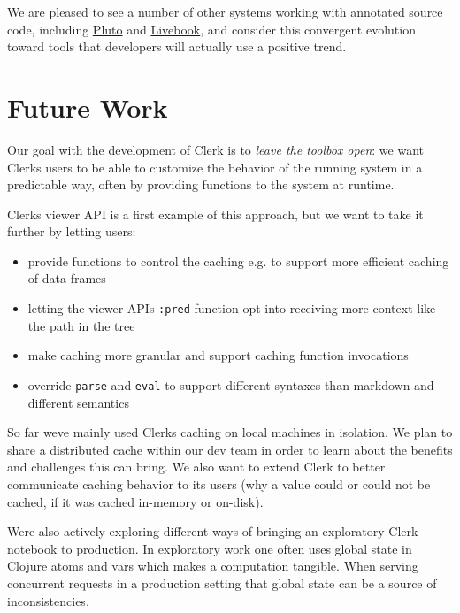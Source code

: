 \documentclass[sigconf,screen]{acmart}
\newcommand{\passthrough}[1]{#1}
\providecommand{\tightlist}{%
  \setlength{\itemsep}{0pt}\setlength{\parskip}{0pt}}
\begin{document}
We are pleased to see a number of other systems working with annotated source code, including \href{https://plutojl.org}{Pluto} and \href{https://livebook.dev}{Livebook}, and consider this convergent evolution toward tools that developers will actually use a positive trend.

\hypertarget{future-work}{%
\section{Future Work}\label{future-work}}

Our goal with the development of Clerk is to \emph{leave the toolbox open}: we want Clerk\textquotesingle s users to be able to customize the behavior of the running system in a predictable way, often by providing functions to the system at runtime.

Clerk\textquotesingle s viewer API is a first example of this approach, but we want to take it further by letting users:

\begin{itemize}
\tightlist
\item
  provide functions to control the caching e.g. to support more efficient caching of data frames
\item
  letting the viewer API\textquotesingle s \passthrough{\lstinline!:pred!} function opt into receiving more context like the path in the tree
\item
  make caching more granular and support caching function invocations
\item
  override \passthrough{\lstinline!parse!} and \passthrough{\lstinline!eval!} to support different syntaxes than markdown and different semantics
\end{itemize}

So far we\textquotesingle ve mainly used Clerk\textquotesingle s caching on local machines in isolation. We plan to share a distributed cache within our dev team in order to learn about the benefits and challenges this can bring. We also want to extend Clerk to better communicate caching behavior to its users (why a value could or could not be cached, if it was cached in-memory or on-disk).

We\textquotesingle re also actively exploring different ways of bringing an exploratory Clerk notebook to production. In exploratory work one often uses global state in Clojure atoms and vars which makes a computation tangible. When serving concurrent requests in a production setting that global state can be a source of inconsistencies.
\end{document}

